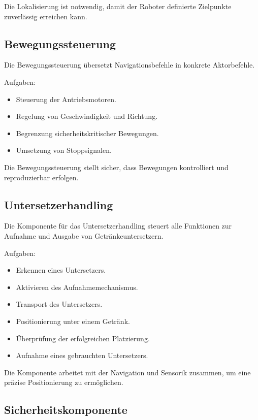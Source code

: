 \documentclass[
  a4paper,
  12pt,
  DIV=12,        %
  parskip=half,  %
  headings=small %
]{scrartcl}
\theoremstyle{definition}
\providecommand{\tightlist}{%
  \setlength{\itemsep}{0pt}\setlength{\parskip}{0pt}}
\theoremstyle{definition}
\begin{document}
Die Lokalisierung ist notwendig, damit der Roboter definierte Zielpunkte
zuverlässig erreichen kann.

\subsection{Bewegungssteuerung}\label{bewegungssteuerung-1}

Die Bewegungssteuerung übersetzt Navigationsbefehle in konkrete
Aktorbefehle.

Aufgaben:

\begin{itemize}
\tightlist
\item
  Steuerung der Antriebsmotoren.
\item
  Regelung von Geschwindigkeit und Richtung.
\item
  Begrenzung sicherheitskritischer Bewegungen.
\item
  Umsetzung von Stoppsignalen.
\end{itemize}

Die Bewegungssteuerung stellt sicher, dass Bewegungen kontrolliert und
reproduzierbar erfolgen.

\subsection{Untersetzerhandling}\label{untersetzerhandling-1}

Die Komponente für das Untersetzerhandling steuert alle Funktionen zur
Aufnahme und Ausgabe von Getränkeuntersetzern.

Aufgaben:

\begin{itemize}
\tightlist
\item
  Erkennen eines Untersetzers.
\item
  Aktivieren des Aufnahmemechanismus.
\item
  Transport des Untersetzers.
\item
  Positionierung unter einem Getränk.
\item
  Überprüfung der erfolgreichen Platzierung.
\item
  Aufnahme eines gebrauchten Untersetzers.
\end{itemize}

Die Komponente arbeitet mit der Navigation und Sensorik zusammen, um
eine präzise Positionierung zu ermöglichen.

\subsection{Sicherheitskomponente}\label{sicherheitskomponente-1}
\end{document}

